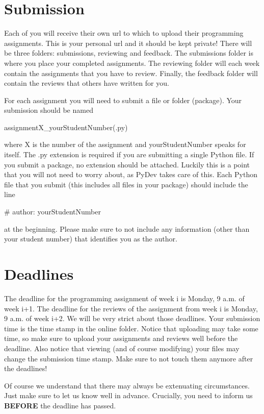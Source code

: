 \documentclass[a4paper, leqno, 11pt]{article}
\begin{document}
\section{Submission} \label{submission}
Each of you will receive their own url to which to upload their programming assignments. This is your personal url and it should
be kept private! There will be three folders: submissions, reviewing and feedback. The submissions folder is where you place your
completed assignments. The reviewing folder will each week contain the assignments that you have to review. Finally, the feedback
folder will contain the reviews that others have written for you.

For each assignment you will need to submit a file or folder (package). Your submission should be named
\begin{center}
assignmentX\_yourStudentNumber(.py)
\end{center}
where X is the number of the assignment and yourStudentNumber speaks for itself. The .py extension is required if you are submitting a
single Python file. If you submit a package, no extension should be attached. Luckily this is a point that you will not need 
to worry about, as PyDev takes care of this. Each Python file that you submit (this includes all files in your package) should
include the line
\begin{center}
\# author: yourStudentNumber
\end{center}
at the beginning. Please make sure to not include any information (other than your student number) that identifies you as the author.

\section{Deadlines}
The deadline for the programming assignment of week i is Monday, 9 a.m. of week i+1. The deadline for the reviews of the assignment
from week i is Monday, 9 a.m. of week i+2. We will be very strict about those deadlines. Your submission time is the time stamp in
the online folder. Notice that uploading may take some time, so make sure to upload your assignments and reviews well before the deadline.
Also notice that viewing (and of course modifying) your files may change the submission time stamp. Make sure to not touch them anymore
after the deadlines!

Of course we understand that there may always be extenuating circumstances. Just make sure to let us know well in advance. Crucially,
you need to inform us \textbf{BEFORE} the deadline has passed.
\end{document}
